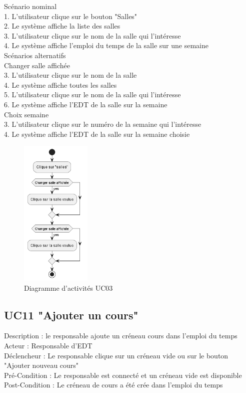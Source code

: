 \documentclass[a4paper,12pt]{article}
\begin{document}
Scénario nominal\\
1. L'utilisateur clique sur le bouton "Salles"\\
2. Le système affiche la liste des salles\\
3. L'utilisateur clique sur le nom de la salle qui l'intéresse\\
4. Le système affiche l'emploi du temps de la salle sur une semaine\\

Scénarios alternatifs\\
Changer salle affichée\\
3. L'utilisateur clique sur le nom de la salle\\
4. Le système affiche toutes les salles\\
5. L'utilisateur clique sur le nom de la salle qui l'intéresse\\
6. Le système affiche l'EDT de la salle sur la semaine\\

Choix semaine\\
3. L'utilisateur clique sur le numéro de la semaine qui l'intéresse\\
4. Le système affiche l'EDT de la salle sur la semaine choisie\\


\begin{figure}[h]
    \centering
    \includegraphics[width=0.3\textwidth]{Diag_activites_UC03.png}
    \caption{Diagramme d'activités UC03}
    \label{fig:act_03}
\end{figure}

\subsection{UC11 "Ajouter un cours"}
Description : le responsable ajoute un créneau cours dans l'emploi du temps\\
Acteur : Responsable d'EDT\\
Déclencheur : Le responsable clique sur un créneau vide ou sur le bouton "Ajouter nouveau cours"\\
Pré-Condition : Le responsable est connecté et un créneau vide est disponible\\
Post-Condition : Le créneau de cours a été crée dans l'emploi du temps\\
\end{document}
